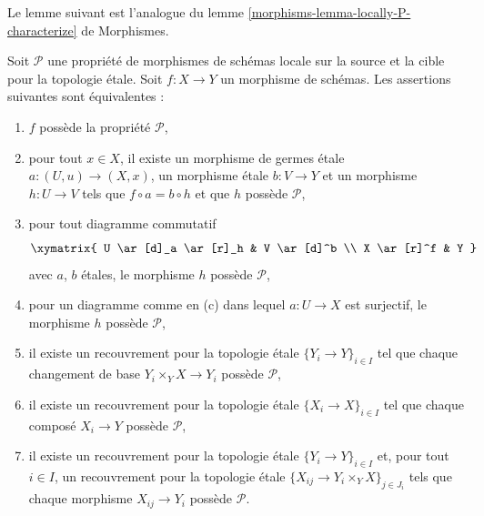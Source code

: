 \noindent
Le lemme suivant est l'analogue du
lemme \ref{morphisms-lemma-locally-P-characterize} de Morphismes.

\begin{lemma}
\label{lemma-local-source-target-characterize}
Soit $\mathcal{P}$ une propriété de morphismes de schémas locale sur la source
et la cible pour la topologie \'etale. Soit $f : X \to Y$ un morphisme de
schémas. Les assertions suivantes sont équivalentes :
\begin{enumerate}
\item[(a)] $f$ possède la propriété $\mathcal{P}$,
\item[(b)] pour tout $x \in X$, il existe un morphisme de germes \'etale
$a : (U, u) \to (X, x)$, un morphisme \'etale $b : V \to Y$ et un morphisme
$h : U \to V$ tels que $f \circ a = b \circ h$ et que $h$ possède
$\mathcal{P}$,
\item[(c)] pour tout diagramme commutatif
$$
\xymatrix{
U \ar[d]_a \ar[r]_h & V \ar[d]^b \\
X \ar[r]^f & Y
}
$$
avec $a$, $b$ étales, le morphisme $h$ possède $\mathcal{P}$,
\item[(d)] pour un diagramme comme en (c) dans lequel $a : U \to X$ est
surjectif, le morphisme $h$ possède $\mathcal{P}$,
\item[(e)] il existe un recouvrement pour la topologie \'etale
$\{Y_i \to Y\}_{i \in I}$ tel
que chaque changement de base $Y_i \times_Y X \to Y_i$ possède
$\mathcal{P}$,
\item[(f)] il existe un recouvrement pour la topologie \'etale
$\{X_i \to X\}_{i \in I}$ tel
que chaque composé $X_i \to Y$ possède $\mathcal{P}$,
\item[(g)] il existe un recouvrement pour la topologie \'etale
$\{Y_i \to Y\}_{i \in I}$ et, pour tout $i \in I$, un recouvrement pour la
topologie \'etale
$\{X_{ij} \to Y_i \times_Y X\}_{j \in J_i}$ tels que chaque morphisme
$X_{ij} \to Y_i$ possède $\mathcal{P}$.
\end{enumerate}
\end{lemma}

